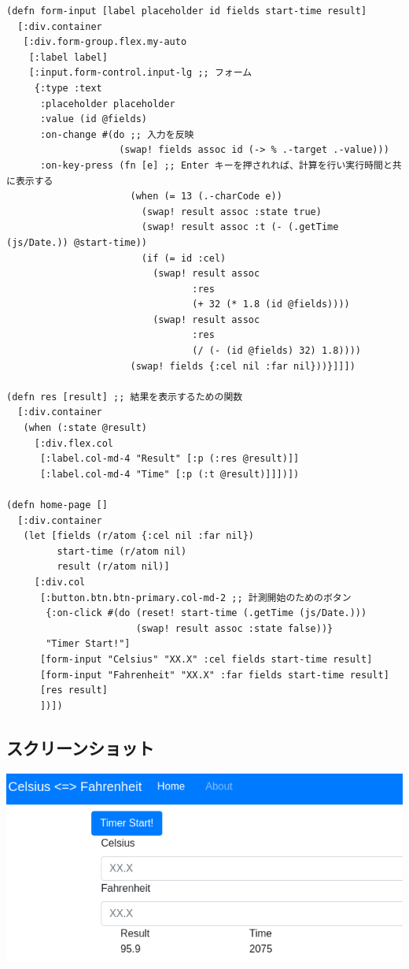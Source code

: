 \documentclass{scrartcl}
\begin{document}
\begin{verbatim}
(defn form-input [label placeholder id fields start-time result]
  [:div.container
   [:div.form-group.flex.my-auto
    [:label label]
    [:input.form-control.input-lg ;; フォーム
     {:type :text
      :placeholder placeholder
      :value (id @fields)
      :on-change #(do ;; 入力を反映
                    (swap! fields assoc id (-> % .-target .-value)))
      :on-key-press (fn [e] ;; Enter キーを押されれば、計算を行い実行時間と共に表示する
                      (when (= 13 (.-charCode e))
                        (swap! result assoc :state true)
                        (swap! result assoc :t (- (.getTime (js/Date.)) @start-time))
                        (if (= id :cel)
                          (swap! result assoc
                                 :res
                                 (+ 32 (* 1.8 (id @fields))))
                          (swap! result assoc
                                 :res
                                 (/ (- (id @fields) 32) 1.8))))
                      (swap! fields {:cel nil :far nil}))}]]])

(defn res [result] ;; 結果を表示するための関数
  [:div.container
   (when (:state @result)
     [:div.flex.col
      [:label.col-md-4 "Result" [:p (:res @result)]]
      [:label.col-md-4 "Time" [:p (:t @result)]]])])

(defn home-page []
  [:div.container
   (let [fields (r/atom {:cel nil :far nil})
         start-time (r/atom nil)
         result (r/atom nil)]
     [:div.col
      [:button.btn.btn-primary.col-md-2 ;; 計測開始のためのボタン
       {:on-click #(do (reset! start-time (.getTime (js/Date.)))
                       (swap! result assoc :state false))}
       "Timer Start!"]
      [form-input "Celsius" "XX.X" :cel fields start-time result]
      [form-input "Fahrenheit" "XX.X" :far fields start-time result]
      [res result]
      ])])
\end{verbatim}

\subsection{スクリーンショット}
\label{sec:org53e496d}
\begin{center}
\includegraphics[width=0.9\linewidth]{./screen3.png}
\end{center}
\end{document}

